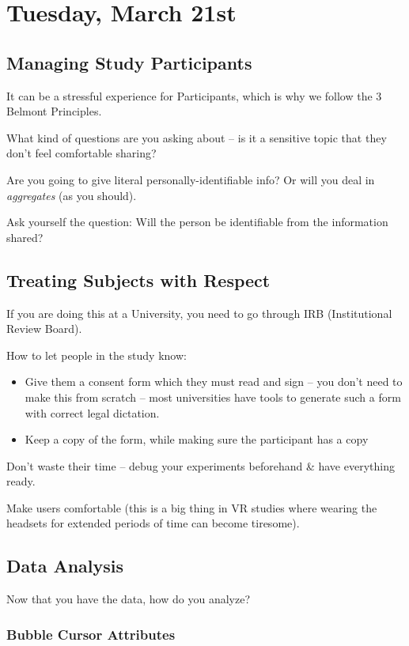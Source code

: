 \section{Tuesday, March 21st}
\subsection{Managing Study Participants}
It can be a stressful experience for Participants, which is why we follow the 3 Belmont Principles.

What kind of questions are you asking about -- is it a sensitive topic that they don't feel comfortable sharing?

Are you going to give literal personally-identifiable info? Or will you deal in \textit{aggregates} (as you should).

\begin{shaded}
Ask yourself the question: Will the person be identifiable from the information shared?
\end{shaded}

\subsection{Treating Subjects with Respect}
If you are doing this at a University, you need to go through IRB (Institutional Review Board).

How to let people in the study know:
\begin{itemize}
    \item Give them a consent form which they must read and sign -- you don't need to make this from scratch -- most universities have tools to generate such a form with correct legal dictation.
    \item Keep a copy of the form, while making sure the participant has a copy
\end{itemize}

Don't waste their time -- debug your experiments beforehand \& have everything ready.

Make users comfortable (this is a big thing in VR studies where wearing the headsets for extended periods of time can become tiresome).

\subsection{Data Analysis}
Now that you have the data, how do you analyze?

\subsubsection{Bubble Cursor Attributes}
